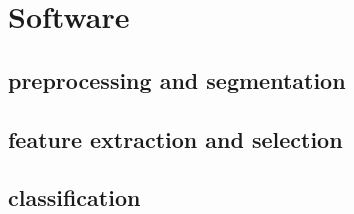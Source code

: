 \section{Software}

\subsection{preprocessing and segmentation}



\subsection{feature extraction and selection}



\subsection{classification}







